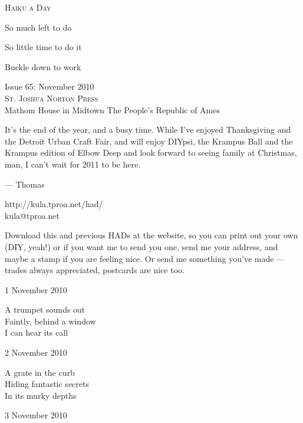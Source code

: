 \documentclass[12pt]{article}
\begin{document}
\begin{center}
{\fontsize{36}{48}\selectfont \textsc{Haiku a Day }}
\end{center}

\vspace*{3.5cm}

{\fontsize{20}{40}\selectfont 


So much left to do

So little time to do it

Buckle down to work

}

\vspace*{5.0cm}
\begin{center}
{\large{Issue 65: November 2010}} \\[5mm]
{\fontsize{8}{8}\selectfont  \textsc{ St. Joshua Norton Press }} \\[1mm]
{\fontsize{6}{6}\selectfont Mathom House in Midtown \textbar The People's Republic of Ames }
\end{center}


\newpage

It's the end of the year, and a busy time. While I've enjoyed
Thanksgiving and the Detroit Urban Craft Fair, and will enjoy
DIYpsi, the Krampus Ball and the Krampus edition of Elbow
Deep and look forward to seeing family at Christmas, man, I
can't wait for 2011 to be here.

--- Thomas

http://kula.tproa.net/had/ \\
kula@tproa.net

Download this and previous HADs at the website, so you can
print out your own (DIY, yeah!) or if you want me to send
you one, send me your address, and maybe a stamp if you
are feeling nice. Or send me something you've made ---
trades always appreciated, postcards are nice too.

\vfill

1 November 2010

A trumpet sounds out \\
Faintly, behind a window \\
I can hear its call

2 November 2010

A grate in the curb \\
Hiding fantastic secrets \\
In its murky depths

\newpage

3 November 2010
\end{document}
